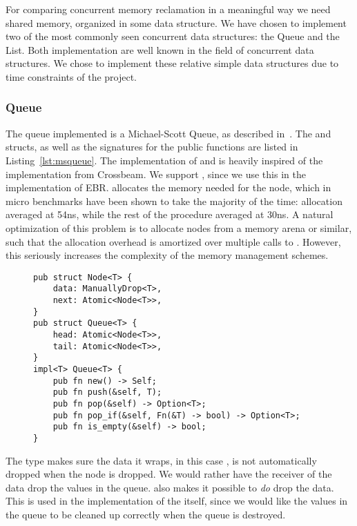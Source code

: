 \documentclass[b5paper]{report}
\begin{document}
For comparing concurrent memory reclamation in a meaningful way we need shared
memory, organized in some data structure. We have chosen to implement two of the
most commonly seen concurrent data structures: the Queue and the List. Both
implementation are well known in the field of concurrent data structures. We
chose to implement these relative simple data structures due to time constraints
of the project.


\subsubsection{Queue}

The queue implemented is a Michael-Scott Queue, as described
in~\cite{michael1996simple}. 
The  and  structs, as well as the signatures for the
public functions are listed in Listing~\ref{lst:msqueue}. The implementation of
 and  is heavily inspired of the implementation from
Crossbeam\cite{crossbeam-msqueue}. We support , since we use this
in the implementation of EBR.  allocates the memory needed for the
node, which in micro benchmarks have been shown to take the majority of the time:
allocation averaged at 54ns, while the rest of the procedure averaged at 30ns.
A natural optimization of this problem is to allocate nodes from a memory arena
or similar, such that the allocation overhead is amortized over multiple calls
to . However, this seriously increases the complexity of the memory
management schemes.

\begin{figure}[ht]
\begin{lstlisting}[caption=Structs for the Michael-Scott
Queue,label=lst:msqueue,numbers=none]
pub struct Node<T> {
    data: ManuallyDrop<T>,
    next: Atomic<Node<T>>,
}
pub struct Queue<T> {
    head: Atomic<Node<T>>,
    tail: Atomic<Node<T>>,
}
impl<T> Queue<T> {
    pub fn new() -> Self;
    pub fn push(&self, T);
    pub fn pop(&self) -> Option<T>;
    pub fn pop_if(&self, Fn(&T) -> bool) -> Option<T>;
    pub fn is_empty(&self) -> bool;
}
\end{lstlisting}
\end{figure}

The  type makes sure the data it wraps, in this case
, is not automatically dropped when the node is dropped. We would rather
have the receiver of the data drop the values in the queue. 
also makes it possible to \emph{do} drop the data. This is used in the
 implementation of the  itself, since we would like the
values in the queue to be cleaned up correctly when the queue is destroyed.
\end{document}
